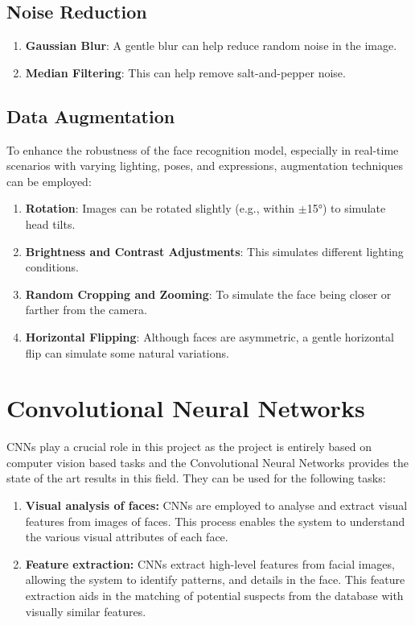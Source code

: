 	\subsection{Noise Reduction}
		\begin{enumerate}
			\item \textbf{Gaussian Blur}: A gentle blur can help reduce random noise in the image.
			\item \textbf{Median Filtering}: This can help remove salt-and-pepper noise.
		\end{enumerate}

	\subsection{Data Augmentation}
		To enhance the robustness of the face recognition model, especially in real-time scenarios with varying lighting, poses, and expressions, augmentation techniques can be employed:
		\begin{enumerate}
			\item \textbf{Rotation}: Images can be rotated slightly (e.g., within $\pm$15°) to simulate head tilts.
			\item \textbf{Brightness and Contrast Adjustments}: This simulates different lighting conditions.
			\item \textbf{Random Cropping and Zooming}: To simulate the face being closer or farther from the camera.
			\item \textbf{Horizontal Flipping}: Although faces are asymmetric, a gentle horizontal flip can simulate some natural variations.
		\end{enumerate}

\section{Convolutional Neural Networks}
	CNNs play a crucial role in this project as the project is entirely based on computer vision based tasks and the Convolutional Neural Networks provides the state of the art results in this field. They can be used for the following tasks:

	\begin{enumerate}
		\item \textbf{Visual analysis of faces:} CNNs are employed to analyse and extract visual features from images of faces. This process enables the system to understand the various visual attributes of each face.
		\item \textbf{Feature extraction:} CNNs extract high-level features from facial images, allowing the system to identify patterns, and details in the face. This feature extraction aids in the matching of potential suspects from the database with visually similar features.
	\end{enumerate}

